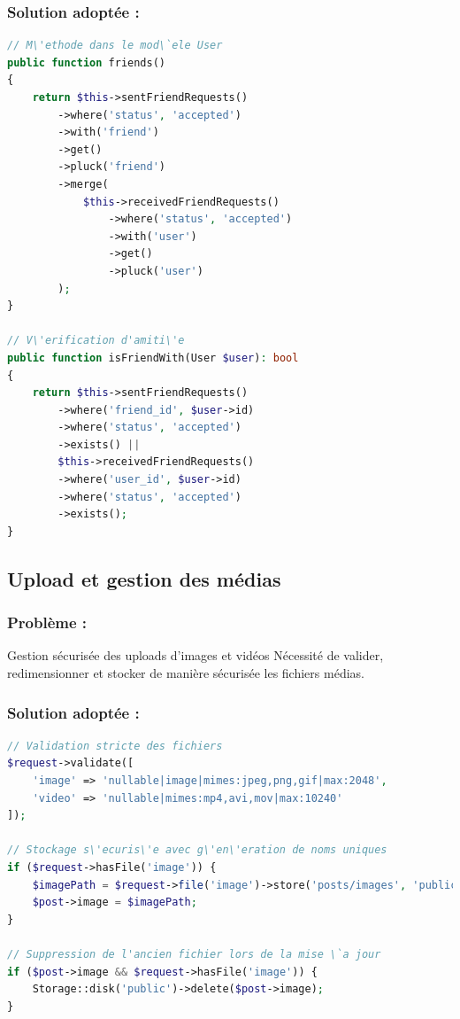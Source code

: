 \documentclass[12pt,a4paper]{article}
\begin{document}
\subsubsection{Solution adopt\'ee :}
\begin{lstlisting}[language=PHP]
// M\'ethode dans le mod\`ele User
public function friends()
{
    return $this->sentFriendRequests()
        ->where('status', 'accepted')
        ->with('friend')
        ->get()
        ->pluck('friend')
        ->merge(
            $this->receivedFriendRequests()
                ->where('status', 'accepted')
                ->with('user')
                ->get()
                ->pluck('user')
        );
}

// V\'erification d'amiti\'e
public function isFriendWith(User $user): bool
{
    return $this->sentFriendRequests()
        ->where('friend_id', $user->id)
        ->where('status', 'accepted')
        ->exists() ||
        $this->receivedFriendRequests()
        ->where('user_id', $user->id)
        ->where('status', 'accepted')
        ->exists();
}
\end{lstlisting}

\subsection{Upload et gestion des m\'edias}

\subsubsection{Probl\`eme :} Gestion s\'ecuris\'ee des uploads d'images et vid\'eos
N\'ecessit\'e de valider, redimensionner et stocker de mani\`ere s\'ecuris\'ee les fichiers m\'edias.

\subsubsection{Solution adopt\'ee :}
\begin{lstlisting}[language=PHP]
// Validation stricte des fichiers
$request->validate([
    'image' => 'nullable|image|mimes:jpeg,png,gif|max:2048',
    'video' => 'nullable|mimes:mp4,avi,mov|max:10240'
]);

// Stockage s\'ecuris\'e avec g\'en\'eration de noms uniques
if ($request->hasFile('image')) {
    $imagePath = $request->file('image')->store('posts/images', 'public');
    $post->image = $imagePath;
}

// Suppression de l'ancien fichier lors de la mise \`a jour
if ($post->image && $request->hasFile('image')) {
    Storage::disk('public')->delete($post->image);
}
\end{lstlisting}
\end{document}
